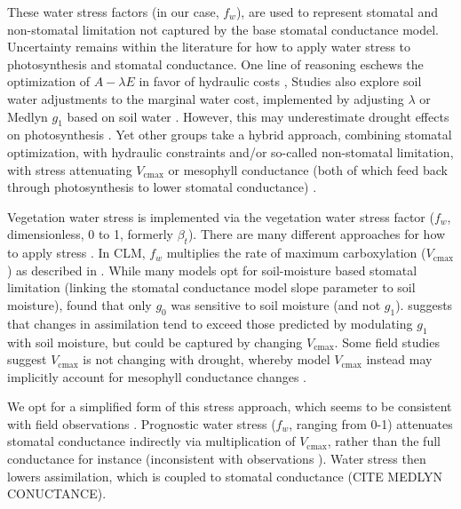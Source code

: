 \documentclass[draft,linenumbers]{agujournal}
\begin{document}
    These water stress factors (in our case, $f_w$), are used to represent stomatal and non-stomatal limitation not captured by the base stomatal conductance model.
    Uncertainty remains within the literature for how to apply water stress to photosynthesis and stomatal conductance.
    One line of reasoning eschews the optimization of $A-\lambda E$ in favor of hydraulic costs \citep{sperry2017},
    Studies also explore soil water adjustments to the marginal water cost, implemented by adjusting $\lambda$ or Medlyn $g_1$ based on soil water \citep{manzoni2013b}.
    However, this may underestimate drought effects on photosynthesis \citep{zhou2013,lin2018}.
    Yet other groups take a hybrid approach, combining stomatal optimization, with hydraulic constraints and/or
    so-called non-stomatal limitation, with stress attenuating $V_{\text{cmax}}$ or mesophyll conductance 
    (both of which feed back through photosynthesis to lower stomatal conductance) \citep{egea2011,novick2016a}.
    

    
    Vegetation water stress is implemented via the vegetation water stress factor ($f_w$, dimensionless, 0 to 1, formerly $\beta_t$). 
    There are many different approaches for how to apply stress \citep{zhou2013,novick2016a,sperry2015}.
    In CLM, $f_w$ multiplies the rate of maximum carboxylation ($V_{\text{cmax}}$) as described in \citet{oleson2013}.
    While many models opt for soil-moisture based stomatal limitation (linking the stomatal conductance model slope parameter to soil moisture),
    \cite{lin2018} found that only $g_0$ was sensitive to soil moisture (and not $g_1$).
    \cite{zhou2013} suggests that changes in assimilation tend to exceed those predicted by modulating $g_1$ with soil moisture, but could be captured by changing $V_{\text{cmax}}$.
    Some field studies suggest $V_{\text{cmax}}$ is not changing with drought, whereby model $V_{\text{cmax}}$ instead may implicitly account for mesophyll conductance changes \citep{flexas2004}.
    
        We opt for a simplified form of this stress approach, which seems to be consistent with field observations \citep{lin2018}.
    Prognostic water stress ($f_w$, ranging from 0-1) attenuates stomatal conductance indirectly via multiplication of $V_{\text{cmax}}$, rather than the full conductance for instance (inconsistent with observations \cite{lin2018}). Water stress then lowers assimilation, which is coupled to stomatal conductance (CITE MEDLYN CONUCTANCE).
    
\end{document}
